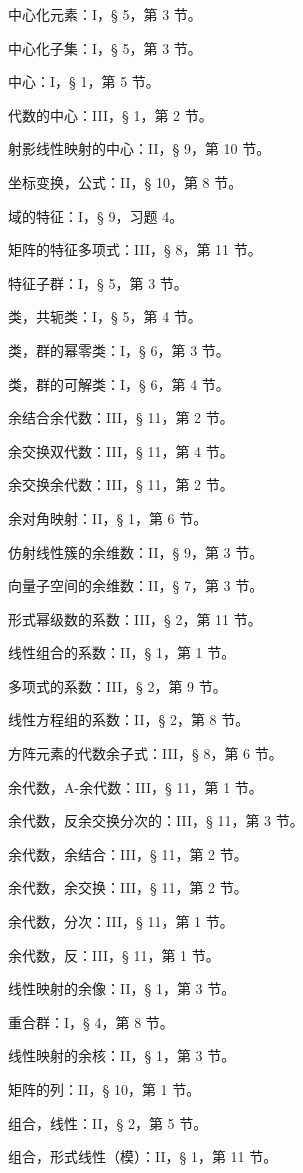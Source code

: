 中心化元素：I，§ 5，第 3 节。

中心化子集：I，§ 5，第 3 节。

中心：I，§ 1，第 5 节。

代数的中心：III，§ 1，第 2 节。

射影线性映射的中心：II，§ 9，第 10 节。

坐标变换，公式：II，§ 10，第 8 节。

域的特征：I，§ 9，习题 4。

矩阵的特征多项式：III，§ 8，第 11 节。

特征子群：I，§ 5，第 3 节。

类，共轭类：I，§ 5，第 4 节。

类，群的幂零类：I，§ 6，第 3 节。

类，群的可解类：I，§ 6，第 4 节。

余结合余代数：III，§ 11，第 2 节。

余交换双代数：III，§ 11，第 4 节。

余交换余代数：III，§ 11，第 2 节。

余对角映射：II，§ 1，第 6 节。

仿射线性簇的余维数：II，§ 9，第 3 节。

向量子空间的余维数：II，§ 7，第 3 节。

形式幂级数的系数：III，§ 2，第 11 节。

线性组合的系数：II，§ 1，第 1 节。

多项式的系数：III，§ 2，第 9 节。

线性方程组的系数：II，§ 2，第 8 节。

方阵元素的代数余子式：III，§ 8，第 6 节。

余代数，A-余代数：III，§ 11，第 1 节。

余代数，反余交换分次的：III，§ 11，第 3 节。

余代数，余结合：III，§ 11，第 2 节。

余代数，余交换：III，§ 11，第 2 节。

余代数，分次：III，§ 11，第 1 节。

余代数，反：III，§ 11，第 1 节。

线性映射的余像：II，§ 1，第 3 节。

重合群：I，§ 4，第 8 节。

线性映射的余核：II，§ 1，第 3 节。

矩阵的列：II，§ 10，第 1 节。

组合，线性：II，§ 2，第 5 节。

组合，形式线性（模）：II，§ 1，第 11 节。

